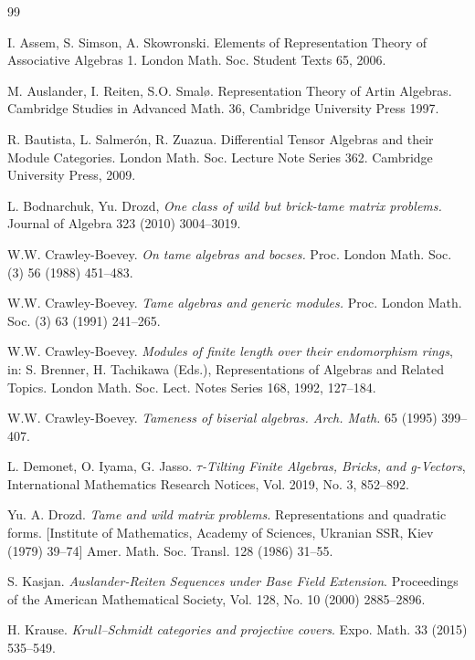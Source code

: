 \documentclass{article}
\theoremstyle{definition}
\begin{document}
\begin{thebibliography}{99}

 I. Assem, S. Simson, A. Skowronski. Elements of Representation Theory of Associative Algebras 1. London Math. Soc. Student Texts 65, 2006.

 M. Auslander, I. Reiten, S.O. Smal\o. Representation Theory of Artin Algebras. Cambridge Studies in Advanced Math. 36, Cambridge University Press 1997.



 R. Bautista, L. Salmer\'on,  R. Zuazua.
Differential Tensor Algebras and their  Module
Categories. London Math. Soc. Lecture Note Series  362.
Cambridge University Press,  2009.

 L. Bodnarchuk, Yu. Drozd, \textit{One class of wild but brick-tame matrix problems.} Journal
of Algebra  323  (2010) 3004--3019.

 W.W. Crawley-Boevey. 
\textit{On tame algebras and bocses.}
Proc. London Math. Soc. (3) 56  (1988) 451--483.

 W.W. Crawley-Boevey.
\textit{Tame algebras and generic modules.}
Proc. London Math. Soc. (3) 63  (1991) 241--265.

 W.W. Crawley-Boevey. 
\textit{Modules of finite length over their endomorphism rings}, in: S. Brenner, H. Tachikawa
(Eds.), Representations of Algebras and Related Topics. London Math. Soc. Lect. Notes Series 168, 1992,
 127--184.

 W.W. Crawley-Boevey. \textit{Tameness of biserial algebras. Arch. Math.} 65 (1995) 399--407.

 L. Demonet, O. Iyama, G. Jasso. \emph{$\tau$-Tilting Finite Algebras, Bricks, and g-Vectors},  International Mathematics Research Notices, Vol. 2019, No. 3, 852--892. 

 Yu. A. Drozd.  
\textit{Tame and wild matrix problems.} 
Representations and quadratic forms. [Institute of
Mathematics, Academy of Sciences, Ukranian SSR, Kiev (1979) 
39--74] 
Amer. Math. Soc. Transl. 128 (1986) 31--55.



 S. Kasjan. \emph{Auslander-Reiten Sequences under Base Field Extension}. 
Proceedings of the American Mathematical Society, Vol. 128, No. 10 (2000) 2885--2896. 

 H. Krause. \emph{Krull–Schmidt categories and projective covers}. Expo. Math. 33 (2015) 535--549.


\end{thebibliography}
\end{document}
